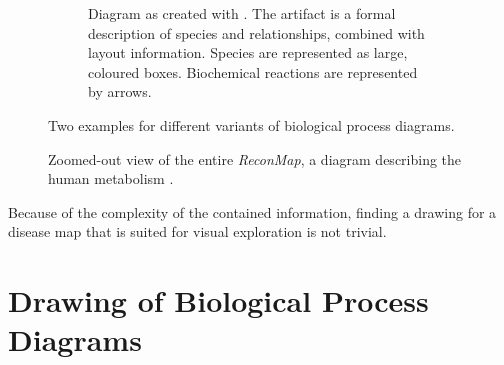 \documentclass[
	fontsize=10pt, %
	twoside=false, %
	secnumdepth=1, %
  toc=indentunnumbered %
]{kaobook}
\begin{document}
\begin{figure}[h]
\begin{subfigure}{0.4\textwidth}
    \caption{Diagram \cite{_CellDesignerProcessDiagram_} as created with
      . The artifact is a formal description of
      species and relationships, combined with layout information. 
      Species are represented as large, coloured boxes.
      Biochemical reactions are represented by arrows. }
    \label{fig:process-diagram-old-vs-new:celldesigner}
  \end{subfigure}
  \caption{
    Two examples for different variants of biological process diagrams.
  }
  \label{fig:process-diagram-old-vs-new}
\end{figure}

\begin{figure}[h]
  \centering
  \caption[Screenshot of the \textit{ReconMap}]{Zoomed-out view of the entire \textit{ReconMap}, a
    diagram describing the human metabolism
    \cite{noronha_ReconMapInteractiveVisualization_2017}.}
  \label{fig:disease-map-example}
\end{figure}

Because of the complexity of the contained information, finding a drawing for a
disease map that is suited for visual exploration is not trivial.


\section{Drawing of Biological Process Diagrams}
\label{sec:draw-biol-netw}
\end{document}
